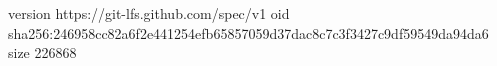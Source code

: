 version https://git-lfs.github.com/spec/v1
oid sha256:246958cc82a6f2e441254efb65857059d37dac8c7c3f3427c9df59549da94da6
size 226868
